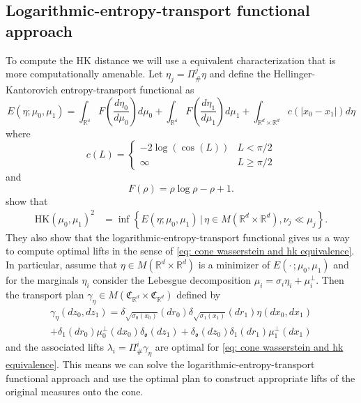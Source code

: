 \documentclass{article}
\begin{document}
\subsection{Logarithmic-entropy-transport functional approach}
To compute the HK distance we will use a equivalent characterization that is more computationally amenable. Let $\eta_j = \Pi^j_\#\eta$ and define the Hellinger-Kantorovich entropy-transport functional as
\begin{equation}
    E(\eta; \mu_0, \mu_1) = \int_{\mathbb{R^d}}F\left(\frac{d\eta_0}{d\mu_0}\right)d\mu_0 + \int_{\mathbb{R^d}}F\left(\frac{d\eta_1}{d\mu_1}\right)d\mu_1 + \int_{\mathbb{R}^d\times \mathbb{R}^d}c(|x_0-x_1|)d\eta
\end{equation}
where
\begin{equation}
    c(L) = \begin{cases}
        -2\log(\cos(L)) & L < \pi/2 \\
        \infty & L \geq \pi/2
    \end{cases}
\end{equation}
and 
\begin{equation}
    F(\rho) = \rho\log\rho - \rho + 1.
\end{equation}
\citet{liero2016optimal} show that 
\begin{align} \label{eq: let hk equivalence}
    \text{HK}(\mu_0, \mu_1)^2 &= \inf\left\{E(\eta;\mu_0, \mu_1) \, |\, \eta  \in M(\mathbb{R}^d\times \mathbb{R}^d), \nu_j  \ll \mu_j\right\}.
\end{align}
They also show that the logarithmic-entropy-transport functional gives us a way to compute optimal lifts in the sense of \cref{eq: cone wasserstein and hk equivalence}. In particular, assume that $\eta \in M(\mathbb{R}^d\times \mathbb{R}^d)$ is a minimizer of $E(\cdot\,; \mu_0, \mu_1)$ and for the marginals $\eta_i$ consider the Lebesgue decomposition $\mu_i = \sigma_i\eta_i + \mu_i^\perp$. Then the transport plan $\gamma_{\eta} \in M(\mathfrak{C}_{\mathbb{R}^d} \times \mathfrak{C}_{\mathbb{R}^d})$ defined by
\begin{multline}
    \gamma_{\eta}(dz_0, dz_1) = \delta_{\sqrt{\sigma_0(x_0)}}(dr_0)\delta_{\sqrt{\sigma_1(x_1)}}(dr_1)\eta(dx_0, dx_1) \\
    + \delta_1(dr_0)\mu_0^\perp(dx_0)\delta_{\mathfrak{o}}(dz_1) + \delta_{\mathfrak{o}}(dz_0)\delta_1(dr_1)\mu_1^\perp(dx_1) 
\end{multline}
and the associated lifts $\lambda_i = \Pi_{\#}^i\gamma_\eta$ are optimal for \cref{eq: cone wasserstein and hk equivalence}. This means we can solve the logarithmic-entropy-transport functional approach and use the optimal plan to construct appropriate lifts of the original measures onto the cone. 
\end{document}
